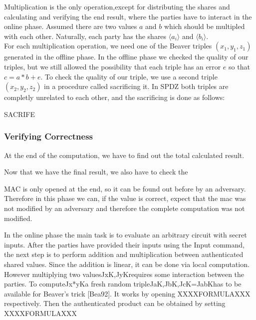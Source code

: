 \documentclass[english,runningheads,a4paper]{llncs}[2018/03/10]
\begin{document}
Multiplication is the only operation,except for distributing the shares and calculating and verifying the end result, where the parties have to interact in the online phase.
Assumed there are two values \( a\) and \( b\) which should be multipled with each other. Naturally, each party has the shares \(\langle a_i\rangle\) and \(\langle b_i\rangle\).\\
For each multiplication operation, we need one of the Beaver triples \( (x_1,y_1,z_1)\) generated in the offline phase. In the offline phase we checked the quality of our triples, but we still allowed the possibility that each triple has an error \(e\) so that \(c=a*b+e\). To check the quality of our triple, we use a second triple \( (x_2,y_2,z_2)\) in a procedure called sacrificing it. In SPDZ both triples are completly unrelated to each other, and the sacrificing is done as follows:\\


SACRIFE


\subsubsection{Verifying Correctness}
At the end of the computation, we have to find out the total calculated result.


Now that we have the final result, we also have to check the 

MAC is only opened at the end, so it can be found out before by an adversary. Therefore in this phase we can, if the value is correct, expect that the mac was not modified by an adversary and therefore the complete computation was not modified.



In the online phase the main task is to evaluate an arbitrary circuit with secret inputs. After the parties have provided their inputs using the Input command, the next step is to perform addition and multiplication between authenticated shared values. Since the addition is linear, it can be done via local computation. However multiplying two valuesJxK,JyKrequires some interaction between the parties. To computeJx*yKa fresh random tripleJaK,JbK,JcK=JabKhas to be available for Beaver’s trick [Bea92]. It works by opening XXXXFORMULAXXX  respectively. Then the authenticated product can be obtained by setting XXXXFORMULAXXX
\end{document}
